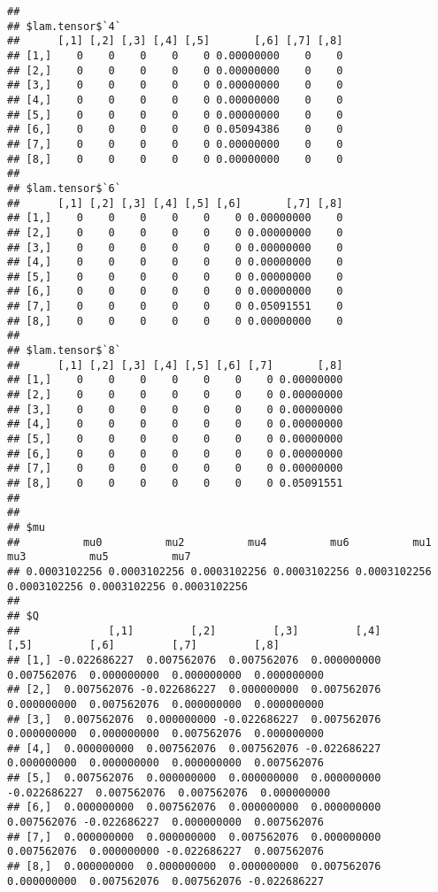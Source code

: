 \documentclass[
]{article}
\begin{document}
\begin{verbatim}
## 
## $lam.tensor$`4`
##      [,1] [,2] [,3] [,4] [,5]       [,6] [,7] [,8]
## [1,]    0    0    0    0    0 0.00000000    0    0
## [2,]    0    0    0    0    0 0.00000000    0    0
## [3,]    0    0    0    0    0 0.00000000    0    0
## [4,]    0    0    0    0    0 0.00000000    0    0
## [5,]    0    0    0    0    0 0.00000000    0    0
## [6,]    0    0    0    0    0 0.05094386    0    0
## [7,]    0    0    0    0    0 0.00000000    0    0
## [8,]    0    0    0    0    0 0.00000000    0    0
## 
## $lam.tensor$`6`
##      [,1] [,2] [,3] [,4] [,5] [,6]       [,7] [,8]
## [1,]    0    0    0    0    0    0 0.00000000    0
## [2,]    0    0    0    0    0    0 0.00000000    0
## [3,]    0    0    0    0    0    0 0.00000000    0
## [4,]    0    0    0    0    0    0 0.00000000    0
## [5,]    0    0    0    0    0    0 0.00000000    0
## [6,]    0    0    0    0    0    0 0.00000000    0
## [7,]    0    0    0    0    0    0 0.05091551    0
## [8,]    0    0    0    0    0    0 0.00000000    0
## 
## $lam.tensor$`8`
##      [,1] [,2] [,3] [,4] [,5] [,6] [,7]       [,8]
## [1,]    0    0    0    0    0    0    0 0.00000000
## [2,]    0    0    0    0    0    0    0 0.00000000
## [3,]    0    0    0    0    0    0    0 0.00000000
## [4,]    0    0    0    0    0    0    0 0.00000000
## [5,]    0    0    0    0    0    0    0 0.00000000
## [6,]    0    0    0    0    0    0    0 0.00000000
## [7,]    0    0    0    0    0    0    0 0.00000000
## [8,]    0    0    0    0    0    0    0 0.05091551
## 
## 
## $mu
##          mu0          mu2          mu4          mu6          mu1          mu3          mu5          mu7 
## 0.0003102256 0.0003102256 0.0003102256 0.0003102256 0.0003102256 0.0003102256 0.0003102256 0.0003102256 
## 
## $Q
##              [,1]         [,2]         [,3]         [,4]         [,5]         [,6]         [,7]         [,8]
## [1,] -0.022686227  0.007562076  0.007562076  0.000000000  0.007562076  0.000000000  0.000000000  0.000000000
## [2,]  0.007562076 -0.022686227  0.000000000  0.007562076  0.000000000  0.007562076  0.000000000  0.000000000
## [3,]  0.007562076  0.000000000 -0.022686227  0.007562076  0.000000000  0.000000000  0.007562076  0.000000000
## [4,]  0.000000000  0.007562076  0.007562076 -0.022686227  0.000000000  0.000000000  0.000000000  0.007562076
## [5,]  0.007562076  0.000000000  0.000000000  0.000000000 -0.022686227  0.007562076  0.007562076  0.000000000
## [6,]  0.000000000  0.007562076  0.000000000  0.000000000  0.007562076 -0.022686227  0.000000000  0.007562076
## [7,]  0.000000000  0.000000000  0.007562076  0.000000000  0.007562076  0.000000000 -0.022686227  0.007562076
## [8,]  0.000000000  0.000000000  0.000000000  0.007562076  0.000000000  0.007562076  0.007562076 -0.022686227
\end{verbatim}
\end{document}
